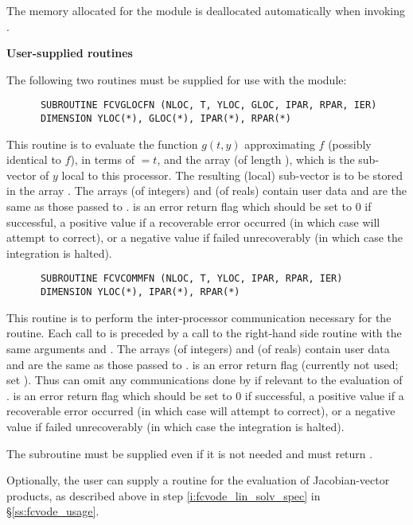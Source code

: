 \begin{Steps}
  The memory allocated for the {\fcvbbd} module is deallocated automatically
  when invoking .


\item {\bf User-supplied routines}

  The following two routines must be supplied for use with the {\cvbbdpre}
  module:
\begin{verbatim}
      SUBROUTINE FCVGLOCFN (NLOC, T, YLOC, GLOC, IPAR, RPAR, IER)
      DIMENSION YLOC(*), GLOC(*), IPAR(*), RPAR(*)
\end{verbatim}
  This routine is to evaluate the function $g(t,y)$ approximating $f$
  (possibly identical to $f$), in terms of  $ = t$, and the array
   (of length ), which is the sub-vector
  of $y$ local to this processor.  The resulting (local) sub-vector
  is to be stored in the array .
  The arrays  (of integers) and  (of reals) contain user data
  and are the same as those passed to .
   is an error return flag which should be set to $0$ if successful, 
  a positive value if a recoverable error occurred (in which case {\cvode} will 
  attempt to correct), or a negative value if  failed unrecoverably 
  (in which case the integration is halted).

\begin{verbatim}
      SUBROUTINE FCVCOMMFN (NLOC, T, YLOC, IPAR, RPAR, IER)
      DIMENSION YLOC(*), IPAR(*), RPAR(*)
\end{verbatim}
  This routine is to perform the inter-processor communication necessary
  for the  routine.
  Each call to  is preceded by a call to the right-hand side
  routine  with the same arguments  and .
  The arrays  (of integers) and  (of reals) contain user data
  and are the same as those passed to .
   is an error return flag (currently not used; set ). 
  Thus  can omit any communications done by  if
  relevant to the evaluation of .
   is an error return flag which should be set to $0$ if successful, 
  a positive value if a recoverable error occurred (in which case {\cvode} will 
  attempt to correct), or a negative value if  failed unrecoverably 
  (in which case the integration is halted).


  {\warn}The subroutine  must be supplied even if it is not needed 
  and must return .

  Optionally, the user can supply a routine  for the evaluation of
  Jacobian-vector products, as described above in step \ref{i:fcvode_lin_solv_spec}
  in \S\ref{ss:fcvode_usage}.

\end{Steps}

